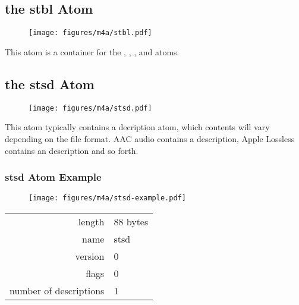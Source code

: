 \clearpage

\subsection{the stbl Atom}
\begin{figure}[h]
  \texttt{[image: figures/m4a/stbl.pdf]}
\end{figure}
\par
\noindent
This atom is a container for the , ,
,  and  atoms.

\clearpage

\subsection{the stsd Atom}
\begin{figure}[h]
\texttt{[image: figures/m4a/stsd.pdf]}
\end{figure}
\par
\noindent
This atom typically contains a decription atom,
which contents will vary depending on the file format.
AAC audio contains a  description,
Apple Lossless contains an  description
and so forth.

\subsubsection{stsd Atom Example}
\begin{figure}[h]
  \texttt{[image: figures/m4a/stsd-example.pdf]}
\end{figure}
\begin{tabular}{rl}
  \textsf{length} & 88 bytes \\
  \textsf{name} & \textsf{stsd} \\
  \textsf{version} & 0 \\
  \textsf{flags} & 0 \\
  \textsf{number of descriptions} & 1 \\
\end{tabular}

\clearpage



